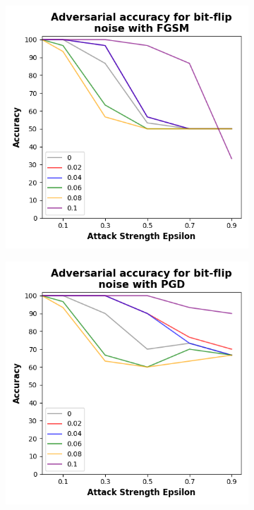 \begin{figure}[!h]
  \centering

  \begin{subfigure}{0.45\textwidth}
      \includegraphics[width=\linewidth]{figures/evaluation_results/iris/pqc/figures/bit-flip-fgsm.png}
      \label{fig:iris7}
  \end{subfigure} \qquad
  \begin{subfigure}{0.45\textwidth}
      \includegraphics[width=\linewidth]{figures/evaluation_results/iris/pqc/figures/bit-flip-pgd.png}

\end{subfigure}
\end{figure}
